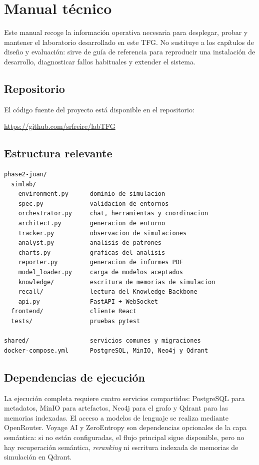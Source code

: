 \chapter{Manual técnico}
\label{ap:manual-tecnico}

Este manual recoge la información operativa necesaria para desplegar, probar y
mantener el laboratorio desarrollado en este TFG. No sustituye a los capítulos de
diseño y evaluación: sirve de guía de referencia para reproducir una
instalación de desarrollo, diagnosticar fallos habituales y extender el sistema.

\section{Repositorio}

El código fuente del proyecto está disponible en el repositorio:
\begin{center}
\url{https://github.com/srfreire/labTFG}
\end{center}

\section{Estructura relevante}

\begin{verbatim}
phase2-juan/
  simlab/
    environment.py      dominio de simulacion
    spec.py             validacion de entornos
    orchestrator.py     chat, herramientas y coordinacion
    architect.py        generacion de entorno
    tracker.py          observacion de simulaciones
    analyst.py          analisis de patrones
    charts.py           graficas del analisis
    reporter.py         generacion de informes PDF
    model_loader.py     carga de modelos aceptados
    knowledge/          escritura de memorias de simulacion
    recall/             lectura del Knowledge Backbone
    api.py              FastAPI + WebSocket
  frontend/             cliente React
  tests/                pruebas pytest

shared/                 servicios comunes y migraciones
docker-compose.yml      PostgreSQL, MinIO, Neo4j y Qdrant
\end{verbatim}

\section{Dependencias de ejecución}

La ejecución completa requiere cuatro servicios compartidos: PostgreSQL para
metadatos, MinIO para artefactos, Neo4j para el grafo y Qdrant para las memorias
indexadas. El acceso a modelos de lenguaje se realiza mediante OpenRouter.
Voyage AI y ZeroEntropy son dependencias opcionales de la capa semántica: si no
están configuradas, el flujo principal sigue disponible, pero no hay
recuperación semántica, \textit{reranking} ni escritura indexada de memorias de
simulación en Qdrant.

